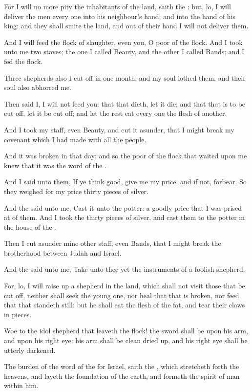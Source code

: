 \Verse For I will no more pity the inhabitants of the land, saith the \LORD: but, lo, I will deliver the men every one into his neighbour's hand, and into the hand of his king: and they shall smite the land, and out of their hand I will not deliver them.

\Verse And I will feed the flock of slaughter, even you, O poor of the flock. And I took unto me two staves; the one I called Beauty, and the other I called Bands; and I fed the flock.

\Verse Three shepherds also I cut off in one month; and my soul lothed them, and their soul also abhorred me.

\Verse Then said I, I will not feed you: that that dieth, let it die; and that that is to be cut off, let it be cut off; and let the rest eat every one the flesh of another.

\Verse And I took my staff, even Beauty, and cut it asunder, that I might break my covenant which I had made with all the people.

\Verse And it was broken in that day: and so the poor of the flock that waited upon me knew that it was the word of the \LORD.

\Verse And I said unto them, If ye think good, give me my price; and if not, forbear. So they weighed for my price thirty pieces of silver.

\Verse And the \LORD said unto me, Cast it unto the potter: a goodly price that I was prised at of them. And I took the thirty pieces of silver, and cast them to the potter in the house of the \LORD.

\Verse Then I cut asunder mine other staff, even Bands, that I might break the brotherhood between Judah and Israel.

\Verse And the \LORD said unto me, Take unto thee yet the instruments of a foolish shepherd.

\Verse For, lo, I will raise up a shepherd in the land, which shall not visit those that be cut off, neither shall seek the young one, nor heal that that is broken, nor feed that that standeth still: but he shall eat the flesh of the fat, and tear their claws in pieces.

\Verse Woe to the idol shepherd that leaveth the flock! the sword shall be upon his arm, and upon his right eye: his arm shall be clean dried up, and his right eye shall be utterly darkened.


\Chapter
\Verse The burden of the word of the \LORD for Israel, saith the \LORD, which stretcheth forth the heavens, and layeth the foundation of the earth, and formeth the spirit of man within him.

